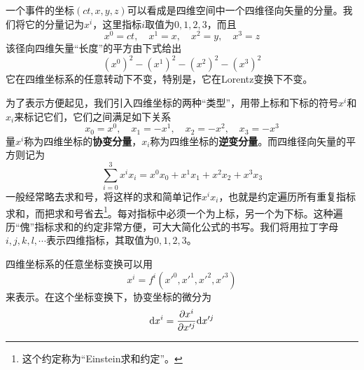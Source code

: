 一个事件的坐标$(ct,x,y,z)$可以看成是四维空间中一个四维径向矢量的分量。我们将它的分量记为$x^i$，这里指标$i$取值为$0,1,2,3$，而且
\begin{equation*}
	x^0 = ct,\quad x^1 = x,\quad x^2 = y,\quad x^3 = z
\end{equation*}
该径向四维矢量“长度”的平方由下式给出
\begin{equation*}
	(x^0)^2-(x^1)^2-(x^2)^2-(x^3)^2
\end{equation*}
它在四维坐标系的任意转动下不变，特别是，它在Lorentz变换下不变。

为了表示方便起见，我们引入四维坐标的两种“类型”，用带上标和下标的符号$x^i$和$x_i$来标记它们，它们之间满足如下关系
\begin{equation}
	x_0 = x^0,\quad x_1 = -x^1,\quad x_2 = -x^2,\quad x_3 = -x^3
	\label{chapter1:四维逆变坐标}
\end{equation}
量$x^i$称为四维坐标的{\bf 协变分量}，$x_i$称为四维坐标的{\bf 逆变分量}。而四维径向矢量的平方则记为
\begin{equation*}
	\sum_{i=0}^3 x^ix_i = x^0x_0+x^1x_1+x^2x_2+x^3x_3
\end{equation*}
一般经常略去求和号，将这样的求和简单记作$x^ix_i$，也就是约定遍历所有重复指标求和，而把求和号省去\footnote{这个约定称为“Einstein求和约定”。}。每对指标中必须一个为上标，另一个为下标。这种遍历“傀”指标求和的约定非常方便，可大大简化公式的书写。我们将用拉丁字母$i,j,k,l,\cdots$表示四维指标，其取值为$0,1,2,3$。

四维坐标系的任意坐标变换可以用
\begin{equation}
	x^i = f^i(x'^0,x'^1,x'^2,x'^3)
\end{equation}
来表示。在这个坐标变换下，协变坐标的微分为
\begin{equation}
	\mathrm{d} x^i = \frac{\partial x^i}{\partial x'^j} \mathrm{d} x'^j
\end{equation}


